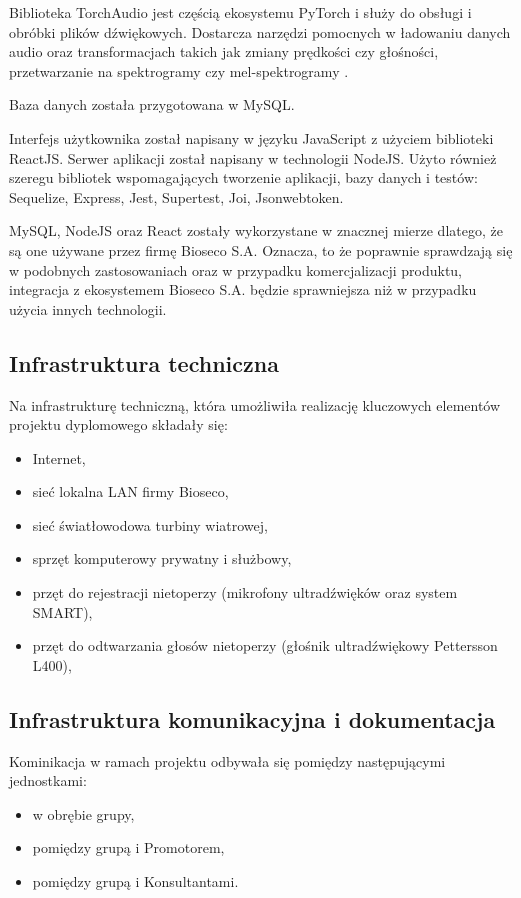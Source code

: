 \documentclass{sprz}
\begin{document}
Biblioteka TorchAudio jest częścią ekosystemu PyTorch i służy do obsługi i obróbki plików dźwiękowych. Dostarcza narzędzi pomocnych w ładowaniu danych audio oraz transformacjach takich jak zmiany prędkości czy głośności, przetwarzanie na spektrogramy czy mel-spektrogramy \cite{torchaudio}.

Baza danych została przygotowana w MySQL.

Interfejs użytkownika został napisany w języku JavaScript z użyciem biblioteki ReactJS. Serwer aplikacji został napisany w technologii NodeJS. Użyto również szeregu bibliotek wspomagających tworzenie aplikacji, bazy danych i testów: Sequelize, Express, Jest, Supertest, Joi, Jsonwebtoken. 

MySQL, NodeJS oraz React zostały wykorzystane w znacznej mierze dlatego, że są one używane przez firmę Bioseco S.A. Oznacza, to że poprawnie sprawdzają się w podobnych zastosowaniach oraz w przypadku komercjalizacji produktu, integracja z ekosystemem Bioseco S.A. będzie sprawniejsza niż w przypadku użycia innych technologii.

\subsection{Infrastruktura techniczna}
Na infrastrukturę techniczną, która umożliwiła realizację kluczowych elementów projektu dyplomowego składały się:
\begin{itemize}
  \item{Internet,}
  \item{sieć lokalna LAN firmy Bioseco,}
  \item{sieć światłowodowa turbiny wiatrowej,}
  \item{sprzęt komputerowy prywatny i służbowy,}
  \item{przęt do rejestracji nietoperzy (mikrofony ultradźwięków oraz system SMART),}
  \item{przęt do odtwarzania głosów nietoperzy (głośnik ultradźwiękowy Pettersson L400),}
  \end{itemize}

\subsection{Infrastruktura komunikacyjna i dokumentacja}
Kominikacja w ramach projektu odbywała się pomiędzy następującymi jednostkami:
\begin{itemize}
  \item{w obrębie grupy,}
  \item{pomiędzy grupą i Promotorem,}
  \item{pomiędzy grupą i Konsultantami.}
  \end{itemize}
\end{document}
